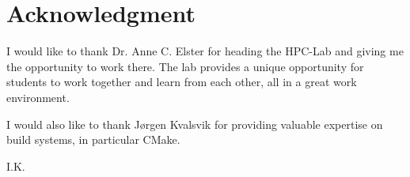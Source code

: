 \section*{Acknowledgment}
I would like to thank Dr. Anne C. Elster for heading the HPC-Lab and giving me the opportunity to work there. The lab provides a unique opportunity for students to work together and learn from each other, all in a great work environment.

I would also like to thank Jørgen Kvalsvik for providing valuable expertise on build systems, in particular CMake.
\begin{flushright}
I.K.\\[1pc]
\end{flushright}